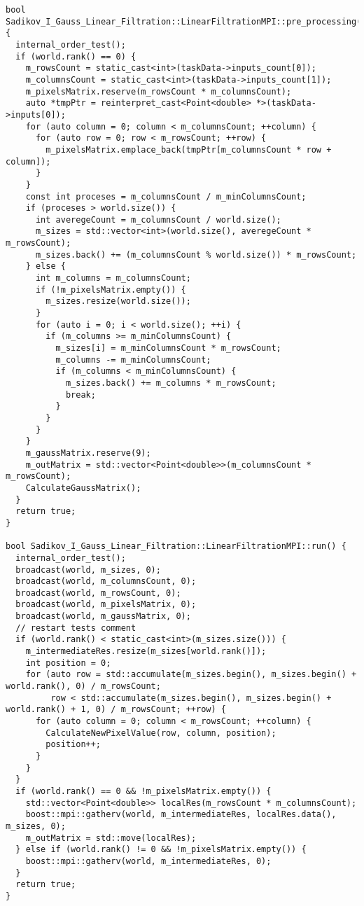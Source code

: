 \documentclass[a4paper,14pt]{report}
\begin{document}
\begin{verbatim}
bool Sadikov_I_Gauss_Linear_Filtration::LinearFiltrationMPI::pre_processing() {
  internal_order_test();
  if (world.rank() == 0) {
    m_rowsCount = static_cast<int>(taskData->inputs_count[0]);
    m_columnsCount = static_cast<int>(taskData->inputs_count[1]);
    m_pixelsMatrix.reserve(m_rowsCount * m_columnsCount);
    auto *tmpPtr = reinterpret_cast<Point<double> *>(taskData->inputs[0]);
    for (auto column = 0; column < m_columnsCount; ++column) {
      for (auto row = 0; row < m_rowsCount; ++row) {
        m_pixelsMatrix.emplace_back(tmpPtr[m_columnsCount * row + column]);
      }
    }
    const int proceses = m_columnsCount / m_minColumnsCount;
    if (proceses > world.size()) {
      int averegeCount = m_columnsCount / world.size();
      m_sizes = std::vector<int>(world.size(), averegeCount * m_rowsCount);
      m_sizes.back() += (m_columnsCount % world.size()) * m_rowsCount;
    } else {
      int m_columns = m_columnsCount;
      if (!m_pixelsMatrix.empty()) {
        m_sizes.resize(world.size());
      }
      for (auto i = 0; i < world.size(); ++i) {
        if (m_columns >= m_minColumnsCount) {
          m_sizes[i] = m_minColumnsCount * m_rowsCount;
          m_columns -= m_minColumnsCount;
          if (m_columns < m_minColumnsCount) {
            m_sizes.back() += m_columns * m_rowsCount;
            break;
          }
        }
      }
    }
    m_gaussMatrix.reserve(9);
    m_outMatrix = std::vector<Point<double>>(m_columnsCount * m_rowsCount);
    CalculateGaussMatrix();
  }
  return true;
}

bool Sadikov_I_Gauss_Linear_Filtration::LinearFiltrationMPI::run() {
  internal_order_test();
  broadcast(world, m_sizes, 0);
  broadcast(world, m_columnsCount, 0);
  broadcast(world, m_rowsCount, 0);
  broadcast(world, m_pixelsMatrix, 0);
  broadcast(world, m_gaussMatrix, 0);
  // restart tests comment
  if (world.rank() < static_cast<int>(m_sizes.size())) {
    m_intermediateRes.resize(m_sizes[world.rank()]);
    int position = 0;
    for (auto row = std::accumulate(m_sizes.begin(), m_sizes.begin() + world.rank(), 0) / m_rowsCount;
         row < std::accumulate(m_sizes.begin(), m_sizes.begin() + world.rank() + 1, 0) / m_rowsCount; ++row) {
      for (auto column = 0; column < m_rowsCount; ++column) {
        CalculateNewPixelValue(row, column, position);
        position++;
      }
    }
  }
  if (world.rank() == 0 && !m_pixelsMatrix.empty()) {
    std::vector<Point<double>> localRes(m_rowsCount * m_columnsCount);
    boost::mpi::gatherv(world, m_intermediateRes, localRes.data(), m_sizes, 0);
    m_outMatrix = std::move(localRes);
  } else if (world.rank() != 0 && !m_pixelsMatrix.empty()) {
    boost::mpi::gatherv(world, m_intermediateRes, 0);
  }
  return true;
}


\end{verbatim}
\end{document}
